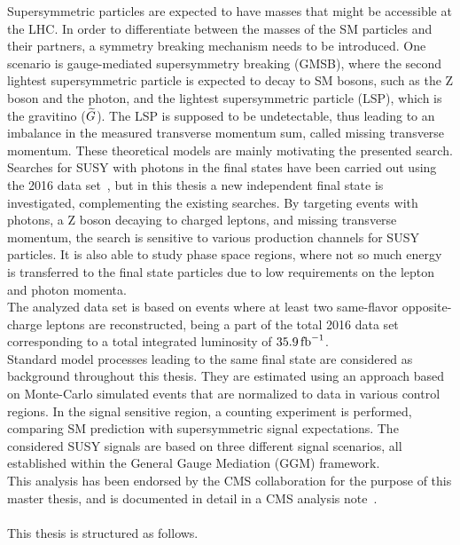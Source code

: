 Supersymmetric particles are expected to have masses that might be accessible at the LHC. In order to differentiate between the masses of the SM particles and their partners, a symmetry breaking mechanism needs to be introduced. One scenario is gauge-mediated supersymmetry breaking (GMSB), where the second lightest supersymmetric particle is expected to decay to SM bosons, such as the Z boson and the photon, and the lightest supersymmetric particle (LSP), which is the gravitino ($\widetilde{G}$). The LSP is supposed to be undetectable, thus leading to an imbalance in the measured transverse momentum sum, called missing transverse momentum. These theoretical models are mainly motivating the presented search.\\
Searches for SUSY with photons in the final states have been carried out using the 2016 data set~\cite{PhotonHT,PhotonMet,PhotonBJet,PhotonLepton}, but in this thesis a new independent final state is investigated, complementing the existing searches. By targeting events with photons, a Z boson decaying to charged leptons, and missing transverse momentum, the search is sensitive to various production channels for SUSY particles. It is also able to study phase space regions, where not so much energy is transferred to the final state particles due to low requirements on the lepton and photon momenta.\\
The analyzed data set is based on events where at least two same-flavor opposite-charge leptons are reconstructed, being a part of the total 2016 data set corresponding to a total integrated luminosity of $35.9\mbox{\ensuremath{\,\text{fb}^\text{$-$1}}}$.\\
Standard model processes leading to the same final state are considered as background throughout this thesis. They are estimated using an approach based on Monte-Carlo simulated events that are normalized to data in various control regions. In the signal sensitive region, a counting experiment is performed, comparing SM prediction with supersymmetric signal expectations. The considered SUSY signals are based on three different signal scenarios, all established within the General Gauge Mediation (GGM) framework.\\
This analysis has been endorsed by the CMS collaboration for the purpose of this master thesis, and is documented in detail in a CMS analysis note~\cite{MyAN}.\\\\
This thesis is structured as follows.
